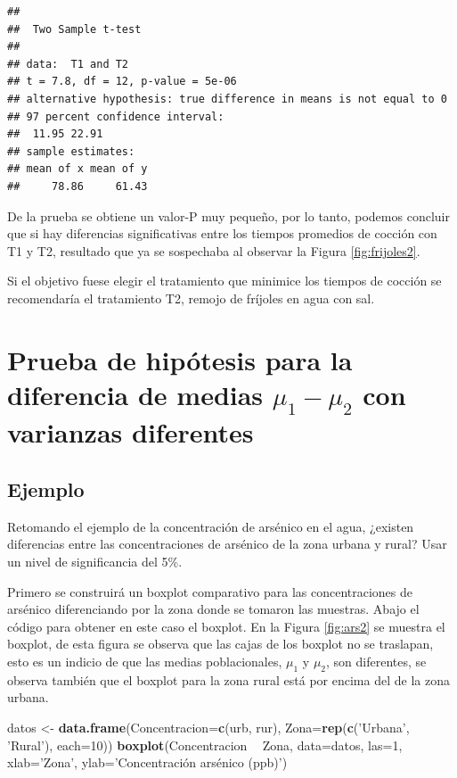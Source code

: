 \documentclass[10pt,]{krantz}
\makeatletter
\newenvironment{Shaded}{\begin{snugshade}}{\end{snugshade}}
\newcommand{\KeywordTok}[1]{\textcolor[rgb]{0.13,0.29,0.53}{\textbf{#1}}}
\newcommand{\DataTypeTok}[1]{\textcolor[rgb]{0.13,0.29,0.53}{#1}}
\newcommand{\DecValTok}[1]{\textcolor[rgb]{0.00,0.00,0.81}{#1}}
\newcommand{\StringTok}[1]{\textcolor[rgb]{0.31,0.60,0.02}{#1}}
\newcommand{\OperatorTok}[1]{\textcolor[rgb]{0.81,0.36,0.00}{\textbf{#1}}}
\newcommand{\NormalTok}[1]{#1}
\newenvironment{kframe}{%
\medskip{}
\setlength{\fboxsep}{.8em}
 \def\at@end@of@kframe{}%
 \ifinner\ifhmode%
  \def\at@end@of@kframe{\end{minipage}}%
  \begin{minipage}{\columnwidth}%
 \fi\fi%
 \def\FrameCommand##1{\hskip\@totalleftmargin \hskip-\fboxsep
 \colorbox{shadecolor}{##1}\hskip-\fboxsep
     \hskip-\linewidth \hskip-\@totalleftmargin \hskip\columnwidth}%
 \MakeFramed {\advance\hsize-\width
   \@totalleftmargin\z@ \linewidth\hsize
   \@setminipage}}%
 {\par\unskip\endMakeFramed%
 \at@end@of@kframe}
\renewenvironment{Shaded}{\begin{kframe}}{\end{kframe}}
\makeatother
\begin{document}
\begin{verbatim}
## 
##  Two Sample t-test
## 
## data:  T1 and T2
## t = 7.8, df = 12, p-value = 5e-06
## alternative hypothesis: true difference in means is not equal to 0
## 97 percent confidence interval:
##  11.95 22.91
## sample estimates:
## mean of x mean of y 
##     78.86     61.43
\end{verbatim}

De la prueba se obtiene un valor-P muy pequeño, por lo tanto, podemos
concluir que si hay diferencias significativas entre los tiempos
promedios de cocción con T1 y T2, resultado que ya se sospechaba al
observar la Figura \ref{fig:frijoles2}.

Si el objetivo fuese elegir el tratamiento que minimice los tiempos de
cocción se recomendaría el tratamiento T2, remojo de fríjoles en agua
con sal.

\section{\texorpdfstring{Prueba de hipótesis para la diferencia de
medias \(\mu_1-\mu_2\) con varianzas
diferentes}{Prueba de hipótesis para la diferencia de medias \textbackslash{}mu\_1-\textbackslash{}mu\_2 con varianzas diferentes}}\label{prueba-de-hipotesis-para-la-diferencia-de-medias-mu_1-mu_2-con-varianzas-diferentes}

\subsection*{Ejemplo}\label{ejemplo-71}


Retomando el ejemplo de la concentración de arsénico en el agua,
¿existen diferencias entre las concentraciones de arsénico de la zona
urbana y rural? Usar un nivel de significancia del 5\%.

Primero se construirá un boxplot comparativo para las concentraciones de
arsénico diferenciando por la zona donde se tomaron las muestras. Abajo
el código para obtener en este caso el boxplot. En la Figura
\ref{fig:ars2} se muestra el boxplot, de esta figura se observa que las
cajas de los boxplot no se traslapan, esto es un indicio de que las
medias poblacionales, \(\mu_1\) y \(\mu_2\), son diferentes, se observa
también que el boxplot para la zona rural está por encima del de la zona
urbana.

\begin{Shaded}
\begin{Highlighting}[]
\NormalTok{datos <-}\StringTok{ }\KeywordTok{data.frame}\NormalTok{(}\DataTypeTok{Concentracion=}\KeywordTok{c}\NormalTok{(urb, rur),}
                    \DataTypeTok{Zona=}\KeywordTok{rep}\NormalTok{(}\KeywordTok{c}\NormalTok{(}\StringTok{'Urbana'}\NormalTok{, }\StringTok{'Rural'}\NormalTok{), }\DataTypeTok{each=}\DecValTok{10}\NormalTok{))}
\KeywordTok{boxplot}\NormalTok{(Concentracion }\OperatorTok{~}\StringTok{ }\NormalTok{Zona, }\DataTypeTok{data=}\NormalTok{datos, }\DataTypeTok{las=}\DecValTok{1}\NormalTok{,}
        \DataTypeTok{xlab=}\StringTok{'Zona'}\NormalTok{, }\DataTypeTok{ylab=}\StringTok{'Concentración arsénico (ppb)'}\NormalTok{)}
\end{Highlighting}
\end{Shaded}
\end{document}
